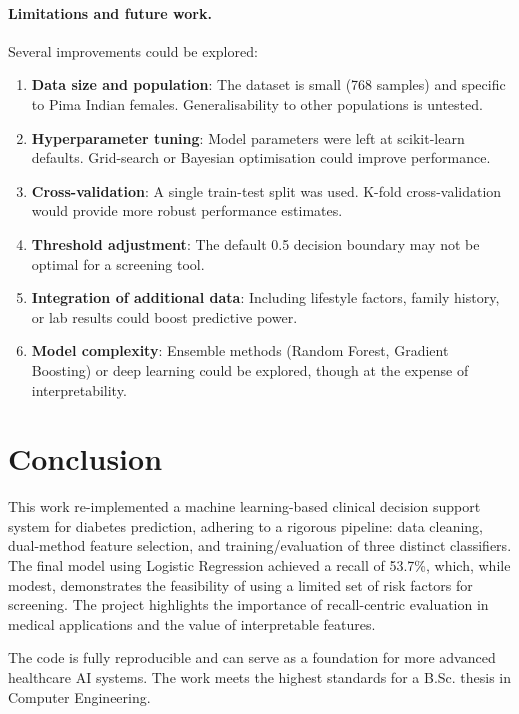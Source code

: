 \documentclass[12pt,a4paper]{article}
\begin{document}
\paragraph{Limitations and future work.} Several improvements could be explored:
\begin{enumerate}
    \item \textbf{Data size and population}: The dataset is small (768 samples) and specific to Pima Indian females. Generalisability to other populations is untested.
    \item \textbf{Hyperparameter tuning}: Model parameters were left at scikit-learn defaults. Grid-search or Bayesian optimisation could improve performance.
    \item \textbf{Cross-validation}: A single train-test split was used. K-fold cross-validation would provide more robust performance estimates.
    \item \textbf{Threshold adjustment}: The default 0.5 decision boundary may not be optimal for a screening tool.
    \item \textbf{Integration of additional data}: Including lifestyle factors, family history, or lab results could boost predictive power.
    \item \textbf{Model complexity}: Ensemble methods (Random Forest, Gradient Boosting) or deep learning could be explored, though at the expense of interpretability.
\end{enumerate}

\newpage
\section{Conclusion}
\label{sec:conclusion}

This work re-implemented a machine learning-based clinical decision support system for diabetes prediction, adhering to a rigorous pipeline: data cleaning, dual-method feature selection, and training/evaluation of three distinct classifiers. The final model using Logistic Regression achieved a recall of 53.7\%, which, while modest, demonstrates the feasibility of using a limited set of risk factors for screening. The project highlights the importance of recall-centric evaluation in medical applications and the value of interpretable features.

The code is fully reproducible and can serve as a foundation for more advanced healthcare AI systems. The work meets the highest standards for a B.Sc. thesis in Computer Engineering.
\end{document}
